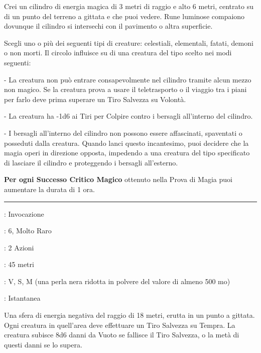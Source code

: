 \begin{multicols}{2}
Crei un cilindro di energia magica di 3 metri di raggio e alto 6 metri, centrato su di un punto del terreno a gittata e che puoi vedere. Rune luminose compaiono dovunque il cilindro si intersechi con il pavimento o altra superficie.

Scegli uno o più dei seguenti tipi di creature: celestiali, elementali, fatati, demoni o non morti. Il circolo influisce su di una creatura del tipo scelto nei modi seguenti:

\medskip

- La creatura non può entrare consapevolmente nel cilindro tramite alcun mezzo non magico. Se la creatura prova a usare il teletrasporto o il viaggio tra i piani per farlo deve prima superare un Tiro Salvezza su Volontà.

- La creatura ha -1d6 ai Tiri per Colpire contro i bersagli all'interno del cilindro.

- I bersagli all'interno del cilindro non possono essere affascinati, spaventati o posseduti dalla creatura. Quando lanci questo incantesimo, puoi decidere che la magia operi in direzione opposta, impedendo a una creatura del tipo specificato di lasciare il cilindro e proteggendo i bersagli all'esterno.

\textbf{Per ogni Successo Critico Magico} ottenuto nella Prova di Magia puoi aumentare la durata di 1 ora.

\smallskip\noindent\rule{\linewidth}{2pt} \hypertarget{Cerchio di Morte}{}\medskip{}
\noindent
\begin{description}[noitemsep, topsep=0pt, parsep=0pt, partopsep=0pt, leftmargin=0cm, labelwidth=2.8cm]
	\item[\textbf{Lista di Magia}]: Invocazione
	\item[\textbf{Livello}]: 6, Molto Raro
	\item[\textbf{T. di Lancio}]: 2 Azioni
	\item[\textbf{Gittata}]: 45 metri
	\item[\textbf{Componenti}]: V, S, M (una perla nera ridotta in polvere del valore di almeno 500 mo)
	\item[\textbf{Durata}]: Istantanea
\end{description}

Una sfera di energia negativa del raggio di 18 metri, erutta in un punto a gittata. Ogni creatura in quell'area deve effettuare un Tiro Salvezza su Tempra. La creatura subisce 8d6 danni da Vuoto se fallisce il Tiro Salvezza, o la metà di questi danni se lo supera.


\end{multicols}
